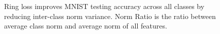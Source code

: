 \documentclass[10pt,twocolumn,letterpaper]{article}
\begin{document}
\begin{figure}%
    \begin{center}
        \hspace{-0.85cm}
    \end{center}
    \vspace{-0.5cm}
\caption{Ring loss improves MNIST testing accuracy across all classes by reducing inter-class norm variance. Norm Ratio is the ratio between average class norm and average norm of all features.} 
\label{fig_accuracy}
\vspace{-0.7cm}
\end{figure}
\end{document}
